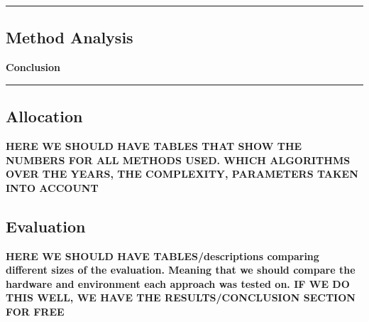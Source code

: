 {\color{gray}\hrule}
\begin{center}
\section{Method Analysis}
\textbf{Conclusion}
\bigskip
\end{center}
{\color{gray}\hrule}
\begin{multicols}{2}
\subsection{Allocation}
\textbf{HERE WE SHOULD HAVE TABLES THAT SHOW THE NUMBERS FOR ALL METHODS USED. WHICH ALGORITHMS OVER THE YEARS, THE COMPLEXITY, PARAMETERS TAKEN INTO ACCOUNT}

\subsection{Evaluation}
\textbf{HERE WE SHOULD HAVE TABLES/descriptions comparing different sizes of the evaluation. Meaning that we should compare the hardware and environment each approach was tested on. IF WE DO THIS WELL, WE HAVE THE RESULTS/CONCLUSION SECTION FOR FREE}
\end{multicols}